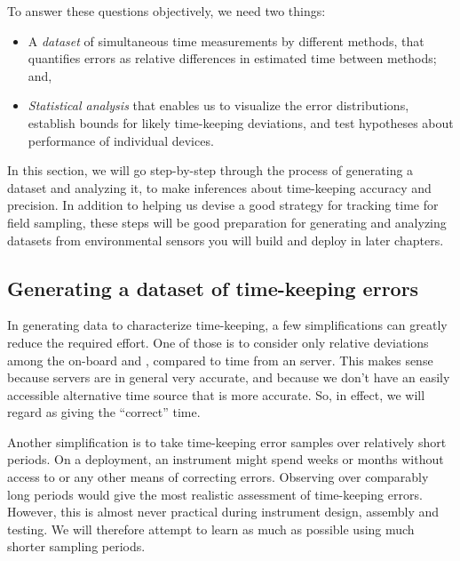 To answer these questions objectively, we need two things:
\begin{itemize}
	\item A \emph{dataset} of simultaneous time measurements by different methods, that quantifies errors as relative differences in estimated time between methods; and,
	\item \emph{Statistical analysis} that enables us to visualize the error distributions, establish bounds for likely time-keeping deviations, and test hypotheses about performance of individual devices.
\end{itemize}
In this section, we will go step-by-step through the process of generating a dataset and analyzing it, to make inferences about time-keeping accuracy and precision. 
In addition to helping us devise a good strategy for tracking time for field sampling, these steps will be good preparation for generating and analyzing datasets from environmental sensors you will build and deploy in later chapters.


\subsection{Generating a dataset of time-keeping errors}
In generating data to characterize time-keeping, a few simplifications can greatly reduce the required effort. 
One of those is to consider only relative deviations among the on-board and  \rtcs, compared to time from an \ntp server. 
This makes sense because \ntp servers are in general very accurate, and because we don't have an easily accessible alternative time source that is more accurate.
So, in effect, we will regard \ntp as giving the ``correct'' time.

Another simplification is to take time-keeping error samples over relatively short periods. 
On a deployment, an instrument might spend weeks or months without access to \ntp or any other means of correcting errors. 
Observing \rtcs over comparably long periods would give the most realistic assessment of time-keeping errors.
However, this is almost never practical during instrument design, assembly and testing.
We will therefore attempt to learn as much as possible using much shorter sampling periods.

